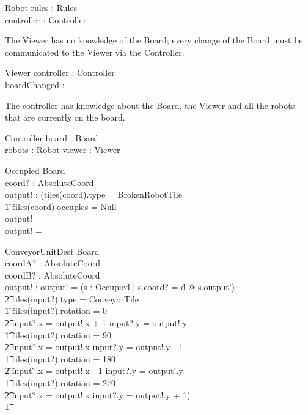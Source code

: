 \documentclass[12pt]{article}
\begin{document}
\begin{schema}{Robot}
rules : Rules \\
controller : Controller
\end{schema}

The Viewer has no knowledge of the Board; every change of the Board must be communicated to the Viewer via the Controller.

\begin{schema}{Viewer}
controller : Controller \\
boardChanged : \bool
\end{schema}

The controller has knowledge about the Board, the Viewer and all the robots that are currently on the board.

\begin{schema}{Controller}
board : Board \\
robots : \power Robot
viewer : Viewer
\end{schema}

\begin{schema}{Occupied}
\Xi Board \\
coord? : AbsoluteCoord \\
output! : \bool
\where
\IF (tiles(coord).type = BrokenRobotTile \; \; \vee \\ \t1
tiles(coord).occupies \not = Null \\
\THEN
output! = \true \\
\ELSE
output! = \false
\end{schema}

\begin{schema}{ConveyorUnitDest}
\Xi Board \\
coordA? : AbsoluteCoord \\
coordB? : AbsoluteCoord \\
output! : \bool
\where
output! = (\exists s : Occupied | s.coord? = d @ \neg s.output!) \; \; \wedge \\ \t2
        tiles(input?).type = ConveyorTile \\ \t1
        tiles(input?).rotation = 0 \Rightarrow \\ \t2 input?.x = output!.x + 1 \wedge input?.y = output!.y \\ \t1
        tiles(input?).rotation = 90 \Rightarrow \\ \t2 input?.x = output!.x \wedge input?.y = output!.y - 1 \\ \t1
        tiles(input?).rotation = 180 \Rightarrow \\ \t2 input?.x = output!.x - 1 \wedge input?.y = output!.y \\ \t1
        tiles(input?).rotation = 270 \Rightarrow \\ \t2 input?.x = output!.x \wedge input?.y = output!.y + 1) \\ \t1
\end{schema}
\end{document}

